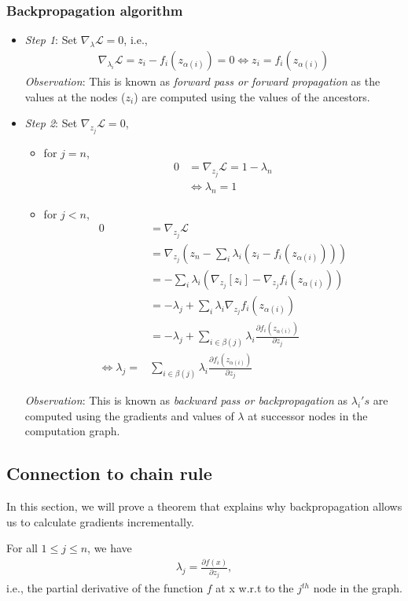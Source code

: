 \documentclass[12pt]{article}
\begin{document}
\subsubsection*{Backpropagation algorithm}
\begin{itemize}
\item \textit{Step 1}: Set $\nabla_{\lambda} \mathcal{L} = 0$, i.e.,
\begin{align}
\nabla_{\lambda_i} \mathcal{L} = z_i - f_i(z_{\alpha(i)}) = 0 \Leftrightarrow z_i = f_i(z_{\alpha(i)})
\end{align}
\textit{Observation}: This is known as \textit{forward pass or forward propagation} as the values at the nodes ($z_i$) are computed using the values of the ancestors.
\item \textit{Step 2}: Set $\nabla_{z_j} \mathcal{L} = 0$, 
\begin{itemize}
\item for $j = n$, 
\begin{align*}
0 &= \nabla_{z_j} \mathcal{L} = 1 - \lambda_n \\
&\Leftrightarrow \lambda_n = 1
\end{align*}
\item for $j < n$,
\begin{align}
0  &= \nabla_{z_j} \mathcal{L} \nonumber \\
&=  \nabla_{z_j} (z_n - \sum_i \lambda_i (z_i - f_i(z_{\alpha(i)}))) \nonumber \\
&= - \sum_i \lambda_i (\nabla_{z_j} [z_i] - \nabla_{z_j} f_i(z_{\alpha(i)})) \nonumber \\
&= -\lambda_j + \sum_i \lambda_i \nabla_{z_j} f_i(z_{\alpha(i)}) \nonumber \\
&= -\lambda_j + \sum_{i \in \beta(j)} \lambda_i \frac{\partial f_i(z_{\alpha(i)})}{\partial z_j} \nonumber \\
\Leftrightarrow \lambda_j =& \sum_{i \in \beta(j)} \lambda_i \frac{\partial f_i(z_{\alpha(i)})}{\partial z_j} \nonumber
\end{align}
\end{itemize}
\textit{Observation}: This is known as \textit{backward pass or backpropagation} as $\lambda_i's$ are computed using the gradients and values of $\lambda$ at successor nodes in the computation graph. 
\end{itemize}


\subsection{Connection to chain rule}
In this section, we will prove a theorem that explains why backpropagation allows us to calculate gradients incrementally.
\begin{theorem}
For all $1 \leq j \leq n$, we have
\begin{align*}
\lambda_j = \frac{\partial f(x)}{\partial z_j},
\end{align*}
i.e., the partial derivative of the function $f$ at x w.r.t to the $j^{th}$ node in the graph.
\end{theorem}
\end{document}
